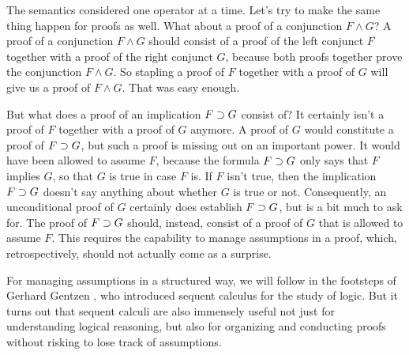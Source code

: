 \documentclass[11pt,twoside]{scrartcl}
\begin{document}
The semantics considered one operator at a time.
Let's try to make the same thing happen for proofs as well.
What about a proof of a conjunction \(F \land G\)?
A proof of a conjunction \(F \land G\) should consist of a proof of the left conjunct $F$ together with a proof of the right conjunct $G$, because both proofs together prove the conjunction \(F \land G\).
So stapling a proof of $F$ together with a proof of $G$ will give us a proof of \(F \land G\).
That was easy enough.

But what does a proof of an implication \(F \supset G\) consist of?
It certainly isn't a proof of $F$ together with a proof of $G$ anymore.
A proof of $G$ would constitute a proof of \(F \supset G\), but such a proof is missing out on an important power.
It would have been allowed to assume $F$, because the formula \(F \supset G\) only says that $F$ implies $G$, so that $G$ is true in case $F$ is.
If $F$ isn't true, then the implication \(F \supset G\) doesn't say anything about whether $G$ is true or not.
Consequently, an unconditional proof of $G$ certainly does establish \(F \supset G\), but is a bit much to ask for.
The proof of \(F \supset G\) should, instead, consist of a proof of $G$ that is allowed to assume $F$.
This requires the capability to manage assumptions in a proof, which, retrospectively, should not actually come as a surprise.

For managing assumptions in a structured way, we will follow in the footsteps of Gerhard Gentzen \cite{Gentzen35I}, who introduced sequent calculus for the study of logic.
But it turns out that sequent calculi are also immensely useful not just for understanding logical reasoning, but also for organizing and conducting proofs without risking to lose track of assumptions.
\end{document}
